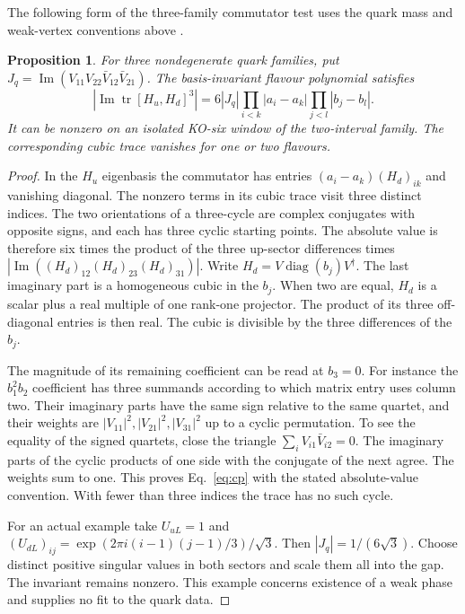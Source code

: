 \documentclass[aps,prd,reprint,onecolumn,nofootinbib,amsmath,amssymb]{revtex4-2}
\newtheorem{proposition}{Proposition}
\begin{document}
The following form of the three-family commutator test uses the quark mass and weak-vertex conventions above \cite{KM1973,Jarlskog1985}.
\begin{proposition}
For three nondegenerate quark families, put $J_q=\operatorname{Im}(V_{11}V_{22}\bar V_{12}\bar V_{21})$. The basis-invariant flavour polynomial satisfies
\begin{equation}
 \left|\operatorname{Im}\operatorname{tr}[H_u,H_d]^3\right|
 =6|J_q|\prod_{i<k}|a_i-a_k|
                \prod_{j<l}|b_j-b_l| .
 \label{eq:cp}
\end{equation}
It can be nonzero on an isolated KO-six window of the two-interval family. The corresponding cubic trace vanishes for one or two flavours.
\end{proposition}

\begin{proof}
In the $H_u$ eigenbasis the commutator has entries $(a_i-a_k)(H_d)_{ik}$ and vanishing diagonal. The nonzero terms in its cubic trace visit three distinct indices. The two orientations of a three-cycle are complex conjugates with opposite signs, and each has three cyclic starting points. The absolute value is therefore six times the product of the three up-sector differences times $|\operatorname{Im}((H_d)_{12}(H_d)_{23}(H_d)_{31})|$. Write $H_d=V\operatorname{diag}(b_j)V^\dagger$. The last imaginary part is a homogeneous cubic in the $b_j$. When two are equal, $H_d$ is a scalar plus a real multiple of one rank-one projector. The product of its three off-diagonal entries is then real. The cubic is divisible by the three differences of the $b_j$.

The magnitude of its remaining coefficient can be read at $b_3=0$. For instance the $b_1^2b_2$ coefficient has three summands according to which matrix entry uses column two. Their imaginary parts have the same sign relative to the same quartet, and their weights are $|V_{11}|^2,|V_{21}|^2,|V_{31}|^2$ up to a cyclic permutation. To see the equality of the signed quartets, close the triangle $\sum_i V_{i1}\bar V_{i2}=0$. The imaginary parts of the cyclic products of one side with the conjugate of the next agree. The weights sum to one. This proves Eq.~\eqref{eq:cp} with the stated absolute-value convention. With fewer than three indices the trace has no such cycle.

For an actual example take $U_{uL}=1$ and $(U_{dL})_{ij}=\exp(2\pi i(i-1)(j-1)/3)/\sqrt3$. Then $|J_q|=1/(6\sqrt3)$. Choose distinct positive singular values in both sectors and scale them all into the gap. The invariant remains nonzero. This example concerns existence of a weak phase and supplies no fit to the quark data.
\end{proof}
\end{document}
